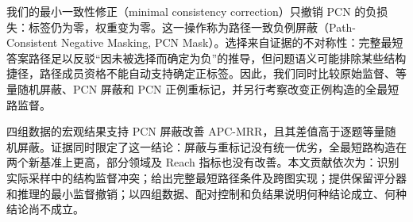 \documentclass[UTF8,a4paper,10pt,fontset=fandol]{ctexart}
\begin{document}
我们的最小一致性修正（minimal consistency correction）只撤销 PCN 的负损失：标签仍为零，权重变为零。这一操作称为路径一致负例屏蔽（Path-Consistent Negative Masking, PCN Mask）。选择来自证据的不对称性：完整最短答案路径足以反驳“因未被选择而确定为负”的推导，但问题语义可能排除某些结构捷径，路径成员资格不能自动支持确定正标签。因此，我们同时比较原始监督、等量随机屏蔽、PCN 屏蔽和 PCN 正例重标记，并另行考察改变正例构造的全最短路监督。

四组数据的宏观结果支持 PCN 屏蔽改善 APC-MRR，且其差值高于逐题等量随机屏蔽。证据同时限定了这一结论：屏蔽与重标记没有统一优劣，全最短路构造在两个新基准上更高，部分领域及 Reach 指标也没有改善。本文贡献依次为：识别实际采样中的结构监督冲突；给出完整最短路径条件及跨图实现；提供保留评分器和推理的最小监督撤销；以四组数据、配对控制和负结果说明何种结论成立、何种结论尚不成立。
\end{document}
